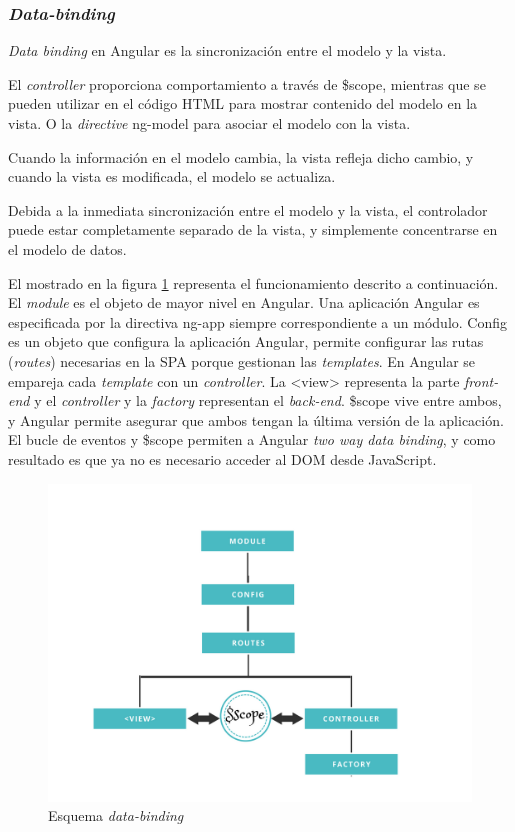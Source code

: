 \subsubsection{\textit{Data-binding}}
\textit{Data binding} en Angular es la sincronización entre el modelo y la vista.


El \textit{controller} proporciona comportamiento a través de \$scope, mientras que {{}} se pueden utilizar en el código HTML para mostrar contenido del modelo en la vista. O la \textit{directive} ng-model para asociar el modelo con la vista.


Cuando la información en el modelo cambia, la vista refleja dicho cambio, y cuando la vista es modificada, el modelo se actualiza.


Debida a la inmediata sincronización entre el modelo y la vista, el controlador puede estar completamente separado de la vista, y simplemente concentrarse en el modelo de datos\cite{data_binding_w3s}.


El mostrado en la figura \ref{fig:data_binding} representa el funcionamiento descrito a continuación. El \textit{module} es el objeto de mayor nivel en Angular. Una aplicación Angular es especificada por la directiva ng-app siempre correspondiente a un módulo.
Config es un objeto que configura la aplicación Angular, permite configurar las rutas (\textit{routes}) necesarias en la SPA porque gestionan las \textit{templates}. En Angular se empareja cada \textit{template} con un \textit{controller}. La <view> representa la parte \textit{front-end} y el \textit{controller} y la \textit{factory}  representan el \textit{back-end}. \$scope vive entre ambos, y Angular permite asegurar que ambos tengan la última versión de la aplicación. El bucle de eventos y \$scope permiten a Angular \textit{two way data binding}, y como resultado es que ya no es necesario acceder al DOM desde JavaScript\cite{paislee}.   


\begin{figure}[htbp] 
    \centering
    \includegraphics[width=1\textwidth]{figuras/data_binding.png}
    \caption{Esquema \textit{data-binding}}
    \label{fig:data_binding}
\end{figure}	


